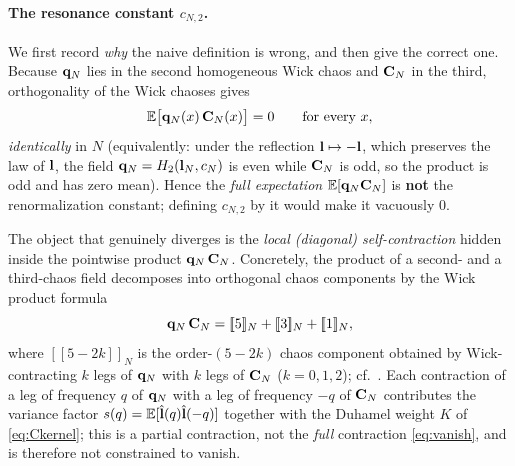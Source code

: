 \paragraph{The resonance constant $c_{N,2}$.}
We first record \emph{why} the naive definition is wrong, and then give the
correct one. Because $\mathbf{q}_N$ lies in the second homogeneous Wick chaos and
$\mathbf{C}_N$ in the third, orthogonality of the Wick chaoses gives
\begin{equation}\label{eq:vanish}
\mathbb{E}\bigl[\mathbf{q}_N(x)\,\mathbf{C}_N(x)\bigr]=0\qquad\text{for every }x ,
\end{equation}
\emph{identically} in $N$ (equivalently: under the reflection $\mathbf{l}\mapsto-\mathbf{l}$,
which preserves the law of $\mathbf{l}$, the field $\mathbf{q}_N=H_2(\mathbf{l}_N,c_N)$ is even
while $\mathbf{C}_N$ is odd, so the product is odd and has zero mean). Hence the
\emph{full expectation} $\mathbb{E}[\mathbf{q}_N\mathbf{C}_N]$ is \textbf{not} the
renormalization constant; defining $c_{N,2}$ by it would make it vacuously $0$.

The object that genuinely diverges is the \emph{local (diagonal) self-contraction}
hidden inside the pointwise product $\mathbf{q}_N\,\mathbf{C}_N$. Concretely, the product of a
second- and a third-chaos field decomposes into orthogonal chaos components by the
Wick product formula
\begin{equation}\label{eq:wickprod}
\mathbf{q}_N\,\mathbf{C}_N=[\![5]\!]_N+[\![3]\!]_N+[\![1]\!]_N ,
\end{equation}
where $[\![5-2k]\!]_N$ is the order-$(5-2k)$ chaos component obtained by Wick-contracting
$k$ legs of $\mathbf{q}_N$ with $k$ legs of $\mathbf{C}_N$ ($k=0,1,2$); cf.\ \cite{CC18}. Each
contraction of a leg of frequency $q$ of $\mathbf{q}_N$ with a leg of frequency $-q$ of
$\mathbf{C}_N$ contributes the variance factor $s(q)=\mathbb{E}[\hat{\mathbf{l}}(q)\hat{\mathbf{l}}(-q)]$ together with
the Duhamel weight $K$ of \eqref{eq:Ckernel}; this is a partial contraction, not the
\emph{full} contraction \eqref{eq:vanish}, and is therefore not constrained to vanish.

